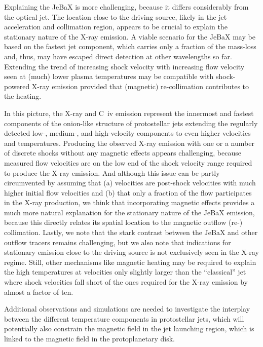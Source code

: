 \documentclass[graybox, nosecnum]{svmult}
\begin{document}
Explaining the JeBaX is more challenging, because it differs considerably from the optical jet. The location close to the driving source, likely in the jet acceleration and collimation region, appears to be crucial to explain the  stationary nature of the X-ray emission. A viable scenario for the JeBaX may be based on the fastest jet component, which carries only a fraction of the mass-loss and, thus, may have escaped direct detection at other wavelengths so far. Extending the trend of increasing shock velocity with increasing flow velocity seen at (much) lower plasma temperatures may be compatible with shock-powered X-ray emission provided that (magnetic) re-collimation contributes to the heating. 

In this picture, the X-ray and C~{\sc iv} emission represent the innermost and fastest components of the onion-like structure of protostellar jets extending the regularly detected low-, medium-, and high-velocity components to even higher velocities and temperatures. Producing the observed X-ray emission with  one or a number of discrete shocks without any magnetic effects appears challenging, because measured flow velocities are on the low end of the shock velocity range required to produce the X-ray emission. And although this issue can be partly  circumvented by assuming that (a) velocities are post-shock velocities with much higher initial flow velocities and (b) that only a fraction of the flow participates in the X-ray production, we think that incorporating magnetic effects provides a much more natural explanation for the stationary nature of the JeBaX emission, because this directly relates its spatial location to the magnetic outflow (re-) collimation. Lastly, we note that the stark contrast between the JeBaX and other outflow tracers remains challenging, but we also note that indications for stationary emission close to the driving source is not exclusively seen in the X-ray regime. Still, other mechanisms like magnetic heating may be required to explain the high temperatures at velocities only slightly larger than the ``classical'' jet where shock velocities fall short of the ones required for the X-ray emission by almost a factor of ten. 

Additional observations and simulations are needed to investigate the interplay between the different temperature components in protostellar jets, which will potentially also constrain the magnetic field in the jet launching region, which is linked to the  magnetic field in the protoplanetary disk.
\end{document}
